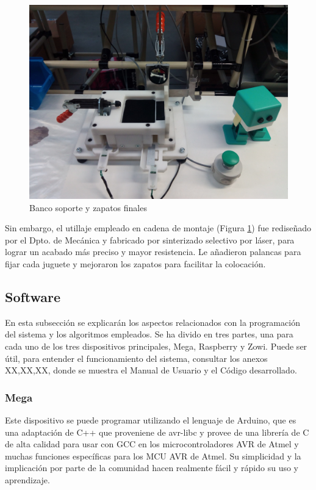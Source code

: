 \begin{figure}
\centering
\includegraphics[width=120mm]{Figures/bancoFabrica}
\caption{Banco soporte y zapatos finales}
\label{fig:bancoFabrica}
\end{figure}

Sin embargo, el utillaje empleado en cadena de montaje (Figura \ref{fig:bancoFabrica}) fue rediseñado por el Dpto. de Mecánica y fabricado por sinterizado selectivo por láser, para lograr un acabado más preciso y mayor resistencia. Le añadieron palancas para fijar cada juguete y mejoraron los zapatos para facilitar la colocación.


\subsection{Software}
\label{subsec:Software}
En esta subsección se explicarán los aspectos relacionados con la programación del sistema y los algoritmos empleados. Se ha divido en tres partes, una para cada uno de los tres dispositivos principales, Mega, Raspberry y Zowi. Puede ser útil, para entender el funcionamiento del sistema, consultar los anexos XX,XX,XX, donde se muestra el Manual de Usuario y el Código desarrollado.

\subsubsection{Mega}
Este dispositivo se puede programar utilizando el lenguaje de Arduino,  que es una adaptación de C++ que proveniene de avr-libc y provee de una librería de C de alta calidad para usar con GCC en los microcontroladores AVR de Atmel y muchas funciones específicas para los MCU AVR de Atmel. Su simplicidad y la implicación por parte de la comunidad hacen realmente fácil y rápido su uso y aprendizaje.


